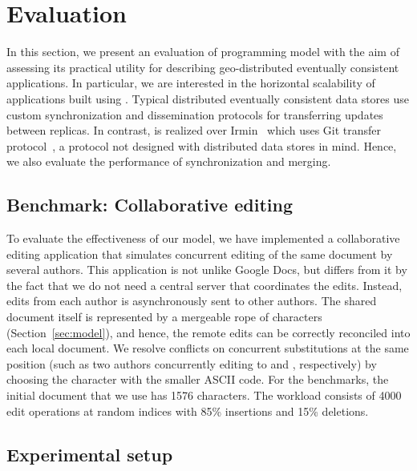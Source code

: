 \section{Evaluation}
\label{sec:evaluation}

In this section, we present an evaluation of \name programming model with the
aim of assessing its practical utility for describing geo-distributed
eventually consistent applications. In particular, we are interested in the
horizontal scalability of applications built using \name. Typical distributed
eventually consistent data stores use custom synchronization and dissemination
protocols for transferring updates between replicas. In contrast, \name is
realized over Irmin~\cite{irmin} which uses Git transfer
protocol~\cite{git-tp}, a protocol not designed with distributed data stores in
mind. Hence, we also evaluate the performance of synchronization and merging.

\subsection{Benchmark: Collaborative editing}

To evaluate the effectiveness of our model, we have implemented a collaborative
editing application that simulates concurrent editing of the same document by
several authors. This application is not unlike Google Docs, but differs from
it by the fact that we do not need a central server that coordinates the edits.
Instead, edits from each author is asynchronously sent to other authors. The
shared document itself is represented by a mergeable rope of characters
(Section~\ref{sec:model}), and hence, the remote edits can be correctly
reconciled into each local document. We resolve conflicts on concurrent
substitutions at the same position (such as two authors concurrently editing
 to  and , respectively) by choosing the character
with the smaller ASCII code. For the benchmarks, the initial document that we
use has 1576 characters. The workload consists of 4000 edit operations at
random indices with 85\% insertions and 15\% deletions.

\subsection{Experimental setup}

